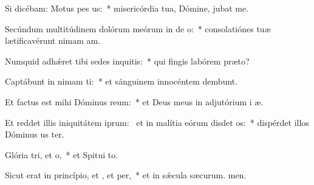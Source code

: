 \item Si dicébam: Motus  pes us:~* misericórdia tua, Dómine, jubat me.
\item Secúndum multitúdinem dolórum meórum in de o:~* consolatiónes tuæ lætificavérunt nimam am.
\item Numquid adhǽret tibi sedes inquitis:~* qui fingis labórem  præto?
\item Captábunt in nimam ti:~* et sánguinem innocéntem dembunt.
\item Et factus est mihi Dóminus  reum:~* et Deus meus in adjutórium i æ.
\item Et reddet illis iniquitátem iprum:~\pscross{} et in malítia eórum disdet os:~* dispérdet illos Dóminus us ter.
\item Glória tri, et o,~* et Spitui to.
\item Sicut erat in princípio, et , et per,~* et in sǽcula sæcurum. men.
